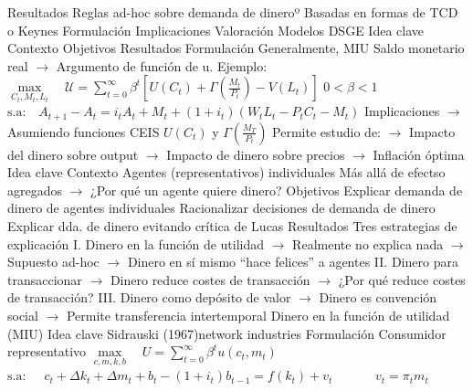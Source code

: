 \documentclass{nuevotema}
\begin{document}
\begin{esquemal}
				\4 Resultados
				\4[] Reglas ad-hoc sobre demanda de dineroº
				\4[] Basadas en formas de TCD o Keynes
			\3 Formulación
			\3 Implicaciones
			\3 Valoración
		\2 Modelos DSGE
			\3 Idea clave
				\4 Contexto
				\4 Objetivos
				\4 Resultados
			\3 Formulación
				\4[] Generalmente, MIU
				\4[] Saldo monetario real
				\4[] $\to$ Argumento de función de u.
				\4[] Ejemplo:
				\4[] $\underset{C_t, M_t, L_t}{\max} \quad \mathcal{U} = \sum_{t=0}^{\infty} \beta^t \left[ U(C_t) + \Gamma \left( \frac{M_t}{P_t} \right) -V(L_t) \right]$
				\4[] $0 < \beta < 1$
				\4[] $\text{s.a:} \quad A_{t+1} - A_t = i_t A_t + M_t + (1+i_t)(W_t L_t - P_t C_t - M_t)$
			\3 Implicaciones
				\4[] 
				\4[] $\to$ Asumiendo funciones CEIS $U(C_t)$ y $\Gamma \left( \frac{M_T}{P_t} \right)$
				\4[] Permite estudio de:
				\4[] $\to$ Impacto del dinero sobre output
				\4[] $\to$ Impacto de dinero sobre precios
				\4[] $\to$ Inflación óptima
	\1 
		\2 Idea clave
			\3 Contexto
				\4 Agentes (representativos) individuales
				\4 Más allá de efectso agregados
				\4[] $\to$ ¿Por qué un agente quiere dinero?
			\3 Objetivos
				\4 Explicar demanda de dinero de agentes individuales
				\4 Racionalizar decisiones de demanda de dinero
				\4 Explicar dda. de dinero evitando crítica de Lucas
			\3 Resultados
				\4 Tres estrategias de explicación
				\4[] I. Dinero en la función de utilidad
				\4[] $\to$ Realmente no explica nada
				\4[] $\to$ Supuesto ad-hoc
				\4[] $\to$ Dinero en sí mismo ``hace felices'' a agentes
				\4[] II. Dinero para transaccionar
				\4[] $\to$ Dinero reduce costes de transacción
				\4[] $\to$ ¿Por qué reduce costes de transacción?
				\4[] III. Dinero como depósito de valor
				\4[] $\to$ Dinero es convención social
				\4[] $\to$ Permite transferencia intertemporal
		\2[I] Dinero en la función de utilidad (MIU)
			\3 Idea clave
				\4 Sidrauski (1967)network industries
			\3 Formulación
				\4[] Consumidor representativo
				\4[] $\underset{c,m,k,b}{\max} \quad U=\sum_{t=0}^{\infty} \beta^t u(c_t,m_t)$
				\4[] $\text{s.a}: \quad \; c_t + \Delta k_t + \Delta m_t + b_t -(1+i_t) b_{t-1} = f(k_t) + v_t$
				\4[] $\quad \quad \quad v_t = \pi_t m_t $

\end{esquemal}
\end{document}
